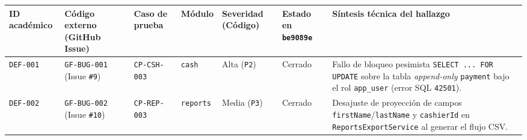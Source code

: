 \documentclass[stu,12pt,a4paper]{apa7}
\newcounter{none}
\begin{document}
{\def\LTcaptype{none} %
\begin{longtable}[]{@{}
  >{\raggedright\arraybackslash}p{}
  >{\raggedright\arraybackslash}p{}
  >{\raggedright\arraybackslash}p{}
  >{\raggedright\arraybackslash}p{}
  >{\raggedright\arraybackslash}p{}
  >{\raggedright\arraybackslash}p{}
  >{\raggedright\arraybackslash}p{}@{}}
\toprule\noalign{}
\begin{minipage}[b]{\linewidth}\raggedright
ID académico
\end{minipage} & \begin{minipage}[b]{\linewidth}\raggedright
Código externo (GitHub Issue)
\end{minipage} & \begin{minipage}[b]{\linewidth}\raggedright
Caso de prueba
\end{minipage} & \begin{minipage}[b]{\linewidth}\raggedright
Módulo
\end{minipage} & \begin{minipage}[b]{\linewidth}\raggedright
Severidad (Código)
\end{minipage} & \begin{minipage}[b]{\linewidth}\raggedright
Estado en \texttt{be9089e}
\end{minipage} & \begin{minipage}[b]{\linewidth}\raggedright
Síntesis técnica del hallazgo
\end{minipage} \\
\midrule\noalign{}
\endhead
\bottomrule\noalign{}
\endlastfoot
\texttt{DEF-{}\allowbreak{}001} & \texttt{GF-{}\allowbreak{}BUG-{}\allowbreak{}001} (Issue \texttt{\#9}) & \texttt{CP-{}\allowbreak{}CSH-{}\allowbreak{}003} & \texttt{cash} & Alta (\texttt{P2}) & Cerrado & Fallo de bloqueo pesimista \texttt{SELECT .\allowbreak{}.\allowbreak{}.\allowbreak{} FOR UPDATE} sobre la tabla \emph{append-only} \texttt{payment} bajo el rol \texttt{app\_\allowbreak{}user} (error SQL \texttt{42501}). \\
\texttt{DEF-{}\allowbreak{}002} & \texttt{GF-{}\allowbreak{}BUG-{}\allowbreak{}002} (Issue \texttt{\#10}) & \texttt{CP-{}\allowbreak{}REP-{}\allowbreak{}003} & \texttt{reports} & Media (\texttt{P3}) & Cerrado & Desajuste de proyección de campos \texttt{firstName}/\texttt{lastName} y \texttt{cashierId} en \texttt{ReportsExportServi\allowbreak{}ce} al generar el flujo CSV. \\

\end{longtable}}
\end{document}

